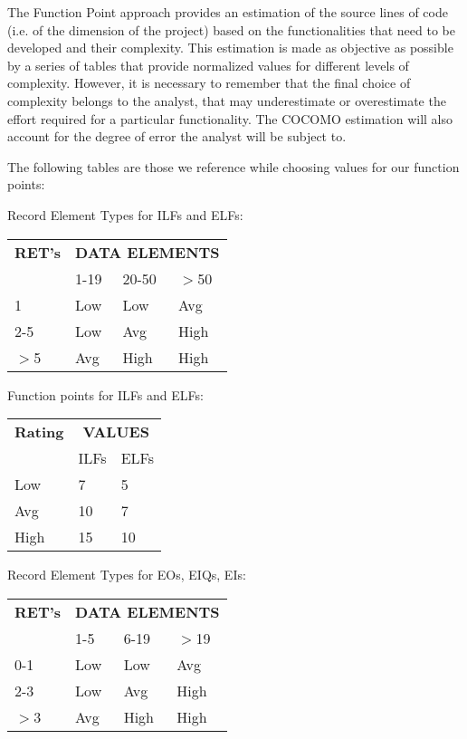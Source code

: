 \label{sec:FP}
The Function Point approach provides an estimation of the source lines of code (i.e. of the dimension of the project) based on the functionalities that need to be developed and their complexity. This estimation is made as objective as possible by a series of tables that provide normalized values for different levels of complexity. However, it is necessary to remember that the final choice of complexity belongs to the analyst, that may underestimate or overestimate the effort required for a particular functionality. The COCOMO estimation will also account for the degree of error the analyst will be subject to. 

The following tables are those we reference while choosing values for our function points:\\

	\begin{center}
		Record Element Types for ILFs and ELFs:
		
		\begin{tabular}{|l|l|l|l|}
			\hline
			\textbf{RET's} & \multicolumn{3}{|c|}{\textbf{DATA ELEMENTS}} \\ \cline{2-4}
			 & 1-19 & 20-50 & $>$50\\ \hline
			 1 & Low & Low & Avg\\ \hline
			 2-5 & Low & Avg & High\\ \hline
			 $>$5 & Avg & High & High\\ \hline
		\end{tabular}
		
		\vspace{1cm}
		
		Function points for ILFs and ELFs:
		
		\begin{tabular}{|l|l|l|}
			\hline
			\textbf{Rating} & \multicolumn{2}{|c|}{\textbf{VALUES}} \\ \cline{2-3}
			 & ILFs & ELFs\\ \hline
			 Low & 7 & 5\\ \hline
			 Avg & 10 & 7\\ \hline
			 High & 15 & 10\\ \hline
		\end{tabular}
		
		\vspace{1cm}
		
		Record Element Types for EOs, EIQs, EIs:
		
		\begin{tabular}{|l|l|l|l|}
			\hline
			\textbf{RET's} & \multicolumn{3}{|c|}{\textbf{DATA ELEMENTS}} \\ \cline{2-4}
			 & 1-5 & 6-19 & $>$19\\ \hline
			 0-1 & Low & Low & Avg\\ \hline
			 2-3 & Low & Avg & High\\ \hline
			 $>$3 & Avg & High & High\\ \hline
		\end{tabular}
		

\end{center}

